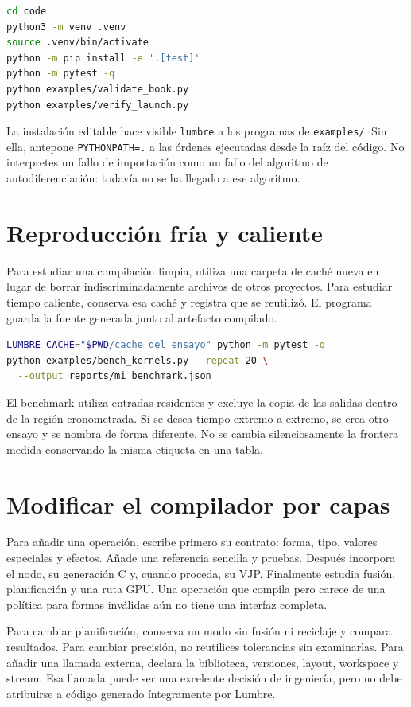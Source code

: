 \begin{lstlisting}[language=bash]
cd code
python3 -m venv .venv
source .venv/bin/activate
python -m pip install -e '.[test]'
python -m pytest -q
python examples/validate_book.py
python examples/verify_launch.py
\end{lstlisting}

La instalación editable hace visible \texttt{lumbre} a los programas de \texttt{examples/}. Sin ella, antepone \texttt{PYTHONPATH=.} a las órdenes ejecutadas desde la raíz del código. No interpretes un fallo de importación como un fallo del algoritmo de autodiferenciación: todavía no se ha llegado a ese algoritmo.

\section{Reproducción fría y caliente}
Para estudiar una compilación limpia, utiliza una carpeta de caché nueva en lugar de borrar indiscriminadamente archivos de otros proyectos. Para estudiar tiempo caliente, conserva esa caché y registra que se reutilizó. El programa guarda la fuente generada junto al artefacto compilado.

\begin{lstlisting}[language=bash]
LUMBRE_CACHE="$PWD/cache_del_ensayo" python -m pytest -q
python examples/bench_kernels.py --repeat 20 \
  --output reports/mi_benchmark.json
\end{lstlisting}

El benchmark utiliza entradas residentes y excluye la copia de las salidas dentro de la región cronometrada. Si se desea tiempo extremo a extremo, se crea otro ensayo y se nombra de forma diferente. No se cambia silenciosamente la frontera medida conservando la misma etiqueta en una tabla.

\section{Modificar el compilador por capas}
Para añadir una operación, escribe primero su contrato: forma, tipo, valores especiales y efectos. Añade una referencia sencilla y pruebas. Después incorpora el nodo, su generación C y, cuando proceda, su VJP. Finalmente estudia fusión, planificación y una ruta GPU. Una operación que compila pero carece de una política para formas inválidas aún no tiene una interfaz completa.

Para cambiar planificación, conserva un modo sin fusión ni reciclaje y compara resultados. Para cambiar precisión, no reutilices tolerancias sin examinarlas. Para añadir una llamada externa, declara la biblioteca, versiones, layout, workspace y stream. Esa llamada puede ser una excelente decisión de ingeniería, pero no debe atribuirse a código generado íntegramente por Lumbre.

